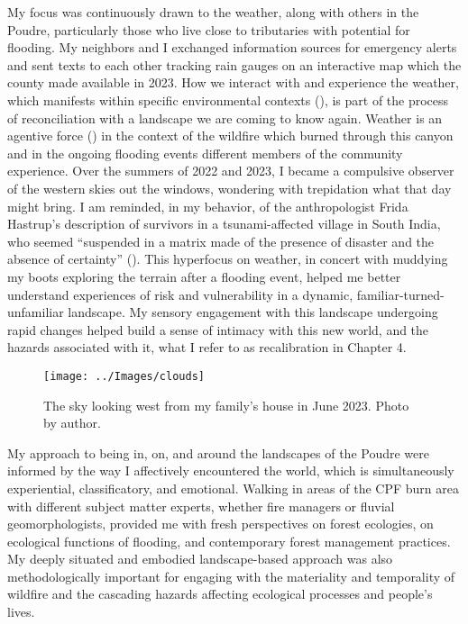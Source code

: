 \documentclass[
]{article}
\begin{document}
My focus was continuously drawn to the weather, along with others in the Poudre, particularly those who live close to tributaries with potential for flooding. My neighbors and I exchanged information sources for emergency alerts and sent texts to each other tracking rain gauges on an interactive map which the county made available in 2023. How we interact with and experience the weather, which manifests within specific environmental contexts (), is part of the process of reconciliation with a landscape we are coming to know again. Weather is an agentive force () in the context of the wildfire which burned through this canyon and in the ongoing flooding events different members of the community experience. Over the summers of 2022 and 2023, I became a compulsive observer of the western skies out the windows, wondering with trepidation what that day might bring. I am reminded, in my behavior, of the anthropologist Frida Hastrup's description of survivors in a tsunami-affected village in South India, who seemed ``suspended in a matrix made of the presence of disaster and the absence of certainty'' (). This hyperfocus on weather, in concert with muddying my boots exploring the terrain after a flooding event, helped me better understand experiences of risk and vulnerability in a dynamic, familiar-turned-unfamiliar landscape. My sensory engagement with this landscape undergoing rapid changes helped build a sense of intimacy with this new world, and the hazards associated with it, what I refer to as recalibration in Chapter 4.

\begin{figure}
\texttt{[image: ../Images/clouds]} \caption[Sky looking west]{The sky looking west from my family's house in June 2023. Photo by author.}\label{fig:figureTitle4}
\end{figure}

My approach to being in, on, and around the landscapes of the Poudre were informed by the way I affectively encountered the world, which is simultaneously experiential, classificatory, and emotional. Walking in areas of the CPF burn area with different subject matter experts, whether fire managers or fluvial geomorphologists, provided me with fresh perspectives on forest ecologies, on ecological functions of flooding, and contemporary forest management practices. My deeply situated and embodied landscape-based approach was also methodologically important for engaging with the materiality and temporality of wildfire and the cascading hazards affecting ecological processes and people's lives.
\end{document}
